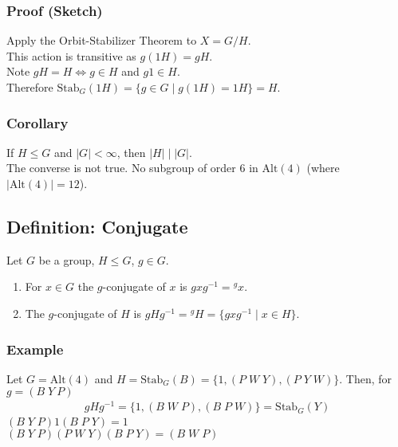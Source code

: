 \documentclass[11pt]{article}
\newcommand{\0}{\emptyset}
\begin{document}
\subsubsection*{Proof (Sketch)}
\label{sec:org6c6d99f}
Apply the Orbit-Stabilizer Theorem to \(X=G/H\).\\[0pt]
This action is transitive as \(g(1H)=gH\).\\[0pt]
Note \(gH=H\iff g\in H\) and \(g1\in H\).\\[0pt]
Therefore \(\text{Stab}_{G}(1H)=\{g\in G\;|\;g(1H)=1H\}=H\).\\[0pt]
\subsubsection*{Corollary}
\label{sec:orgd458c1a}
If \(H\leq G\) and \(|G|<\infty\), then \(|H|\mid|G|\).\\[0pt]
The converse is not true. No subgroup of order \(6\) in \(\text{Alt}(4)\) (where \(|\text{Alt}(4)|=12\)).\\[0pt]
\subsection*{Definition: Conjugate}
\label{sec:org8b3a960}
Let \(G\)  be a group, \(H\leq G\), \(g\in G\).\\[0pt]
\begin{enumerate}
\item For \(x\in G\) the \(g\)-conjugate of \(x\) is \(gxg^{-1}={}^{g}x\).\\[0pt]
\item The \(g\)-conjugate of \(H\) is \(gHg^{-1}={}^{g}H=\{gxg^{-1}\;|\;x\in H\}\).\\[0pt]
\end{enumerate}
\subsubsection*{Example}
\label{sec:org0cfed25}
Let \(G=\text{Alt}(4)\) and \(H=\text{Stab}_{G}(B)=\{1,(P\;W\;Y),(P\;Y\;W)\}\). Then, for \(g=(B\;Y\:P)\)\\[0pt]
\begin{align*}
  gHg^{-1}=\{1,(B\;W\;P),(B\;P\;W)\}=\text{Stab}_{G}(Y)
\end{align*}
\((B\;Y\;P)1(B\;P\;Y)=1\)\\[0pt]
\((B\;Y\;P)(P\;W\;Y)(B\;P\;Y)=(B\;W\;P)\)\\[0pt]
\end{document}
